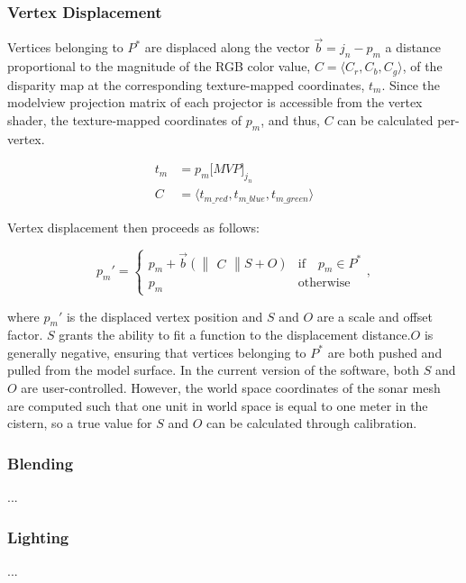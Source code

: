\documentclass[a4paper,twoside]{article}
\begin{document}
\subsubsection{Vertex Displacement}

Vertices belonging to $P^{*}$ are displaced along the vector $\vec{b} = j_{n} - p_{m}$ a distance proportional to the magnitude of the RGB color value, $C = \langle C_{r}, C_{b}, C_{g} \rangle$, of the disparity map at the corresponding texture-mapped coordinates, $t_m$. Since the modelview projection matrix of each projector is accessible from the vertex shader, the texture-mapped coordinates of $p_m$, and thus, $C$ can be calculated per-vertex.

\begin{align}
t_{m} &= p_{m}\lbrack MVP \rbrack _{j_{n}} \\
C &= \langle t_{m\_red}, t_{m\_blue}, t_{m\_green} \rangle
\end{align}

Vertex displacement then proceeds as follows:

\begin{equation}
p_{m}' = \left \{ 
\begin{array}{ll}
p_{m} + \vec{b} (\begin{Vmatrix}C\end{Vmatrix} S + O) & \text{if} \quad p_{m} \in P^{*}\\
p_{m} & \text{otherwise}
\end{array},\right.
\label{eq:displace}
\end{equation}

where $p_{m}'$ is the displaced vertex position and $S$ and $O$ are a scale and offset factor. $S$ grants the ability to fit a function to the displacement distance.$O$ is generally negative, ensuring that vertices belonging to $P^{*}$ are both pushed and pulled from the model surface. In the current version of the software, both $S$ and $O$ are user-controlled. However, the world space coordinates of the sonar mesh are computed such that one unit in world space is equal to one meter in the cistern, so a true value for $S$ and $O$ can be calculated through calibration.
 
 \subsubsection{Blending}
 ...
 
 \subsubsection{Lighting}
 ...
\end{document}
